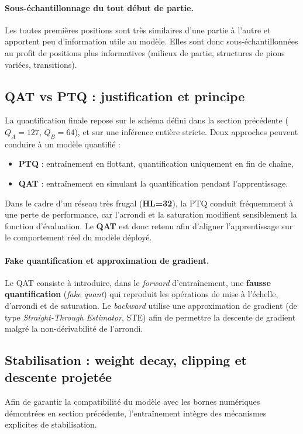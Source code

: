 \documentclass[11pt, a4paper]{article}
\begin{document}
\paragraph{Sous-échantillonnage du tout début de partie.}
Les toutes premières positions sont très similaires d'une partie à l'autre et apportent peu d'information utile au modèle. Elles sont donc sous-échantillonnées au profit de positions plus informatives (milieux de partie, structures de pions variées, transitions).

\subsection{QAT vs PTQ : justification et principe}
La quantification finale repose sur le schéma défini dans la section précédente ($Q_A=127$, $Q_B=64$), et sur une inférence entière stricte. Deux approches peuvent conduire à un modèle quantifié :
\begin{itemize}
    \item \textbf{PTQ} : entraînement en flottant, quantification uniquement en fin de chaîne,
    \item \textbf{QAT} : entraînement en simulant la quantification pendant l'apprentissage.
\end{itemize}
Dans le cadre d'un réseau très frugal (\textbf{HL=32}), la PTQ conduit fréquemment à une perte de performance, car l'arrondi et la saturation modifient sensiblement la fonction d'évaluation. Le \textbf{QAT} est donc retenu afin d'aligner l'apprentissage sur le comportement réel du modèle déployé.

\paragraph{Fake quantification et approximation de gradient.}
Le QAT consiste à introduire, dans le \textit{forward} d'entraînement, une \textbf{fausse quantification} (\textit{fake quant}) qui reproduit les opérations de mise à l'échelle, d'arrondi et de saturation. Le \textit{backward} utilise une approximation de gradient (de type \textit{Straight-Through Estimator}, STE) afin de permettre la descente de gradient malgré la non-dérivabilité de l'arrondi.

\subsection{Stabilisation : weight decay, clipping et descente projetée}
Afin de garantir la compatibilité du modèle avec les bornes numériques démontrées en section précédente, l'entraînement intègre des mécanismes explicites de stabilisation.
\end{document}
